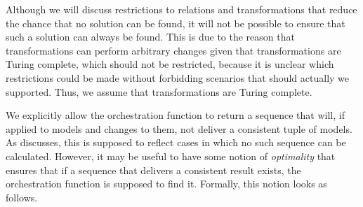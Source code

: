Although we will discuss restrictions to relations and transformations that reduce the chance that no solution can be found, it will not be possible to ensure that such a solution can always be found. This is due to the reason that transformations can perform arbitrary changes given that transformations are Turing complete, which should not be restricted, because it is unclear which restrictions could be made without forbidding scenarios that should actually we supported. Thus, we assume that transformations are Turing complete.

We explicitly allow the orchestration function to return a sequence that will, if applied to models and changes to them, not deliver a consistent tuple of models. As discusses, this is supposed to reflect cases in which no such sequence can be calculated.
However, it may be useful to have some notion of \emph{optimality} that ensures that if a sequence that delivers a consistent result exists, the orchestration function is supposed to find it.
Formally, this notion looks as follows.

